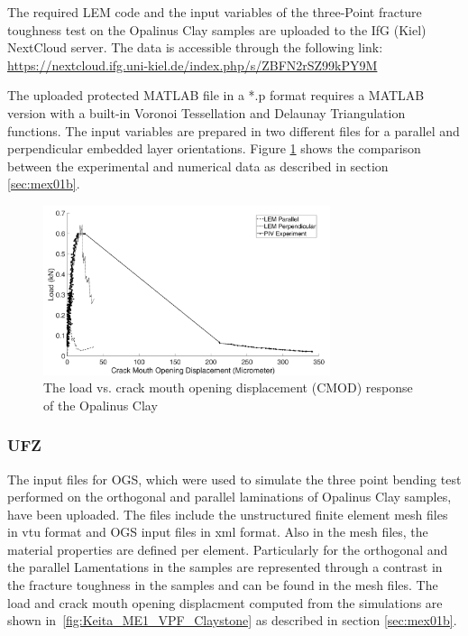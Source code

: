 The required LEM code and the input variables of the three-Point fracture toughness test on the Opalinus Clay samples are uploaded to the IfG (Kiel) NextCloud server. The data is accessible through the following link:\\
\url{https://nextcloud.ifg.uni-kiel.de/index.php/s/ZBFN2rSZ99kPY9M}

The uploaded protected MATLAB file in a *.p format requires a MATLAB version with a built-in Voronoi Tessellation and Delaunay Triangulation functions. The input variables are prepared in two different files for a parallel and perpendicular embedded layer orientations. Figure \ref{fig:Amir_ME1_LEM_Claystone_Data} shows the comparison between the experimental and numerical data as described in section \ref {sec:mex01b}.

\begin{figure}[!ht]
\centering
\includegraphics[width=0.75\textwidth]{figures/Amir_ME1_LEM_Claystone_Data.png}
\caption{The load vs. crack mouth opening displacement (CMOD) response of the Opalinus Clay}
\label{fig:Amir_ME1_LEM_Claystone_Data}
\end{figure}

\subsubsection*{UFZ}
The input files for OGS, which were used to simulate the three point bending test performed on the orthogonal and parallel laminations of Opalinus Clay samples, have been uploaded.
The files include the unstructured finite element mesh files in vtu format and OGS input files in xml format.
Also in the mesh files, the material properties are defined per element. 
Particularly for the orthogonal and the parallel Lamentations in the samples are represented through a contrast in the fracture toughness in the samples and can be found in the mesh files.
The load and crack mouth opening displacment computed from the simulations are shown in~\ref{fig:Keita_ME1_VPF_Claystone} as described in section \ref {sec:mex01b}.

